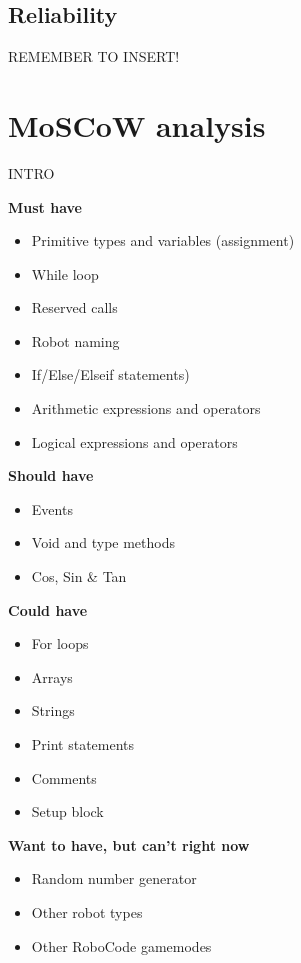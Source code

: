 \subsection{Reliability}
REMEMBER TO INSERT!

\section{MoSCoW analysis}
INTRO

\textbf{Must have}
\begin{itemize}
\item Primitive types and variables (assignment)
\item While loop
\item Reserved calls
\item Robot naming
\item If/Else/Elseif statements)
\item Arithmetic expressions and operators
\item Logical expressions and operators
\end{itemize}
\textbf{Should have}
\begin{itemize}
\item Events
\item Void and type methods
\item Cos, Sin \& Tan
\end{itemize}
\textbf{Could have}
\begin{itemize}
\item For loops
\item Arrays
\item Strings
\item Print statements
\item Comments
\item Setup block
\end{itemize}
\textbf{Want to have, but can’t right now}
\begin{itemize}
\item Random number generator
\item Other robot types
\item Other RoboCode gamemodes
\end{itemize}

 
